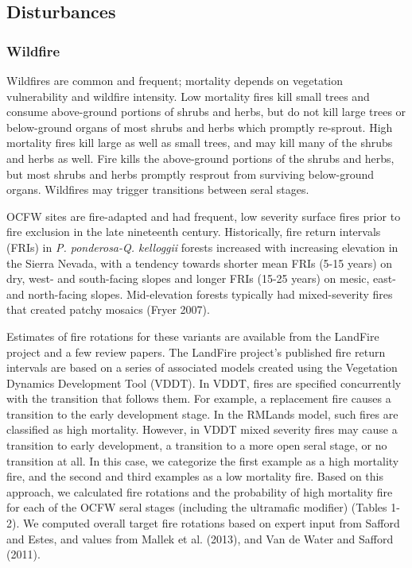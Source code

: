 \subsection*{Disturbances}

\subsubsection{Wildfire}
Wildfires are common and frequent; mortality depends on vegetation vulnerability and wildfire intensity. Low mortality fires kill small trees and consume above-ground portions of shrubs and herbs, but do not kill large trees or below-ground organs of most shrubs and herbs which promptly re-sprout. High mortality fires kill large as well as small trees, and may kill many of the shrubs and herbs as well. Fire kills the above-ground portions of the shrubs and herbs, but most shrubs and herbs promptly resprout from surviving below-ground organs. Wildfires may trigger transitions between seral stages.

OCFW sites are fire-adapted and had frequent, low severity surface fires prior to fire exclusion in the late nineteenth century. Historically, fire return intervals (FRIs) in \emph{P. ponderosa-Q. kelloggii} forests increased with increasing elevation in the Sierra Nevada, with a tendency towards shorter mean FRIs (5-15 years) on dry, west- and south-facing slopes and longer FRIs (15-25 years) on mesic, east- and north-facing slopes. Mid-elevation forests typically had mixed-severity fires that created patchy mosaics (Fryer 2007).

Estimates of fire rotations for these variants are available from the LandFire project and a few review papers. The LandFire project’s published fire return intervals are based on a series of associated models created using the Vegetation Dynamics Development Tool (VDDT). In VDDT, fires are specified concurrently with the transition that follows them. For example, a replacement fire causes a transition to the early development stage. In the RMLands model, such fires are classified as high mortality. However, in VDDT mixed severity fires may cause a transition to early development, a transition to a more open seral stage, or no transition at all. In this case, we categorize the first example as a high mortality fire, and the second and third examples as a low mortality fire. Based on this approach, we calculated fire rotations and the probability of high mortality fire for each of the OCFW seral stages (including the ultramafic modifier) (Tables 1-2). We computed overall target fire rotations based on expert input from Safford and Estes, and values from Mallek et al. (2013), and Van de Water and Safford (2011). 




